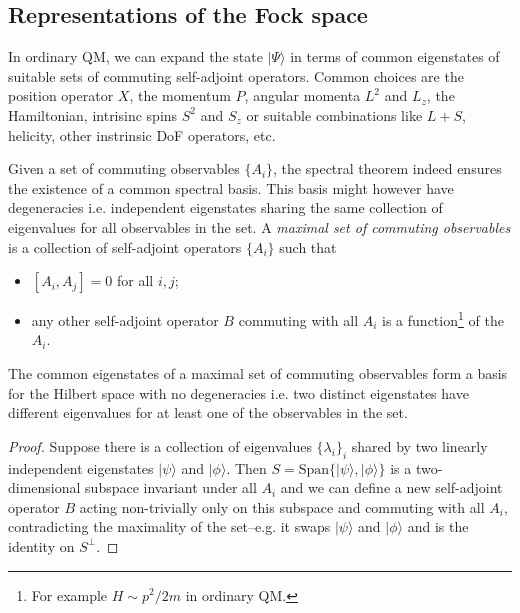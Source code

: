 \documentclass[../QFT_main.tex]{subfiles}
\begin{document}
\subsection{Representations of the Fock space}\label{sec:representation_field_fock_space}


\begin{mytheorem}
%
In ordinary QM, we can expand the state $|\Psi\rangle$ in terms of common eigenstates of suitable sets of commuting self-adjoint operators.
Common choices are the position operator $X$, the momentum $P$, angular momenta $L^2$ and $L_z$, the Hamiltonian, intrisinc spins $S^2$ and $S_z$ or suitable combinations like $L+S$, helicity, other instrinsic DoF operators, etc.

Given a set of commuting observables $\{A_i\}$, the spectral theorem indeed ensures the existence of a common spectral basis.
This basis might however have degeneracies i.e. independent eigenstates sharing the same collection of eigenvalues for all observables in the set.
A \emph{maximal set of commuting observables} is a collection of self-adjoint operators $\{A_i\}$ such that
\begin{itemize}
    \item $[A_i, A_j] = 0$ for all $i, j$;
    \item any other self-adjoint operator $B$ commuting with all $A_i$ is a function\footnote{For example $H\sim p^2/2m$ in ordinary QM.} of the $A_i$.
\end{itemize}
The common eigenstates of a maximal set of commuting observables form a basis for the Hilbert space with no degeneracies i.e. two distinct eigenstates have different eigenvalues for at least one of the observables in the set.
\end{mytheorem}
\begin{proof}
Suppose there is a collection of eigenvalues $\{\lambda_i\}_i$ shared by two linearly independent eigenstates $|\psi\rangle$ and $|\phi\rangle$.
Then $S=\text{Span}\{|\psi\rangle, |\phi\rangle\}$ is a two-dimensional subspace invariant under all $A_i$ and we can define a new self-adjoint operator $B$ acting non-trivially only on this subspace and commuting with all $A_i$, contradicting the maximality of the set--e.g. it swaps $|\psi\rangle$ and $|\phi\rangle$ and is the identity on $S^{\perp}$.
\end{proof}
\end{document}
